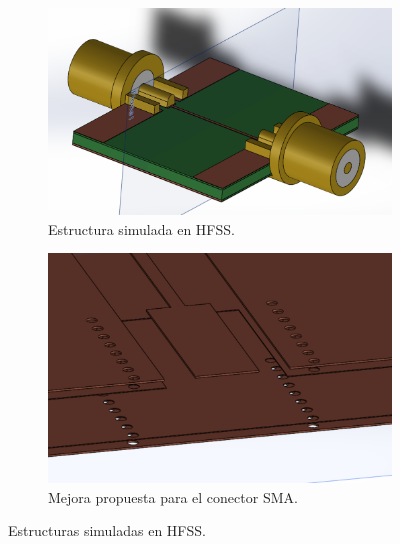 \begin{figure}
    \centering

    \begin{subfigure}[b]{0.45\textwidth}
        \includegraphics[width=\textwidth]{images/sma_simulation_setup.png}
        \caption{Estructura simulada en HFSS.}
        \label{fig:sma_simulation_setup}
    \end{subfigure}
    \hfill
    \begin{subfigure}[b]{0.45\textwidth}
        \includegraphics[width=\textwidth]{images/sma_improvement_setup.png}
        \caption{Mejora propuesta para el conector SMA.}
        \label{fig:sma_improvement_setup}
    \end{subfigure}

    \caption{Estructuras simuladas en HFSS.}
        \label{fig:sma_simulations_setup}
\end{figure}

